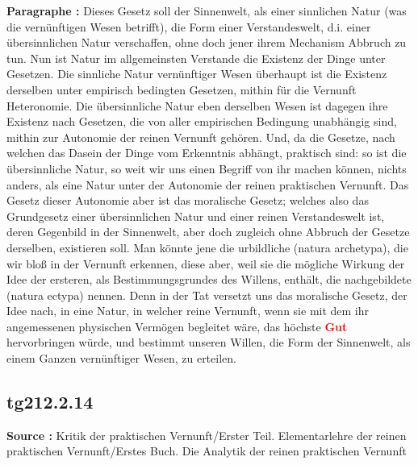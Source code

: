 \documentclass[a4paper,12pt,twoside]{book}
\newcommand{\match}[1]{\textcolor{red}{\textbf{#1}}}
\begin{document}
	\noindent\textbf{Paragraphe : }Dieses Gesetz soll der Sinnenwelt, als einer sinnlichen Natur (was die vernünftigen Wesen betrifft), die Form einer Verstandeswelt, d.i. einer übersinnlichen Natur verschaffen, ohne doch jener ihrem Mechanism Abbruch zu tun. Nun ist Natur im allgemeinsten Verstande die Existenz der Dinge unter Gesetzen. Die sinnliche Natur vernünftiger Wesen überhaupt ist die Existenz derselben unter empirisch bedingten Gesetzen, mithin für die Vernunft Heteronomie. Die übersinnliche Natur eben derselben Wesen ist dagegen ihre Existenz nach Gesetzen, die von aller empirischen Bedingung unabhängig sind, mithin zur Autonomie der reinen Vernunft gehören. Und, da die Gesetze, nach welchen  das Dasein der Dinge vom Erkenntnis abhängt, praktisch sind: so ist die übersinnliche Natur, so weit wir uns einen Begriff von ihr machen können, nichts anders, als eine Natur unter der Autonomie der reinen praktischen Vernunft. Das Gesetz dieser Autonomie aber ist das moralische Gesetz; welches also das Grundgesetz einer übersinnlichen Natur und einer reinen Verstandeswelt ist, deren Gegenbild in der Sinnenwelt, aber doch zugleich ohne Abbruch der Gesetze derselben, existieren soll. Man könnte jene die urbildliche (natura archetypa), die wir bloß in der Vernunft erkennen, diese aber, weil sie die mögliche Wirkung der Idee der ersteren, als Bestimmungsgrundes des Willens, enthält, die nachgebildete (natura ectypa) nennen. Denn in der Tat versetzt uns das moralische Gesetz, der Idee nach, in eine Natur, in welcher reine Vernunft, wenn sie mit dem ihr angemessenen physischen Vermögen begleitet wäre, das höchste \match{Gut} hervorbringen würde, und bestimmt unseren Willen, die Form der Sinnenwelt, als einem Ganzen vernünftiger Wesen, zu erteilen. 
	
	\subsection*{tg212.2.14} 
	\textbf{Source : }Kritik der praktischen Vernunft/Erster Teil. Elementarlehre der reinen praktischen Vernunft/Erstes Buch. Die Analytik der reinen praktischen Vernunft\\  
	
\end{document}
